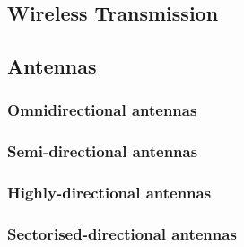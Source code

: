 \subsection{Wireless Transmission}
\subsection{Antennas}
\subsubsection{Omnidirectional antennas}
\subsubsection{Semi-directional antennas}
\subsubsection{Highly-directional antennas}
\subsubsection{Sectorised-directional antennas}